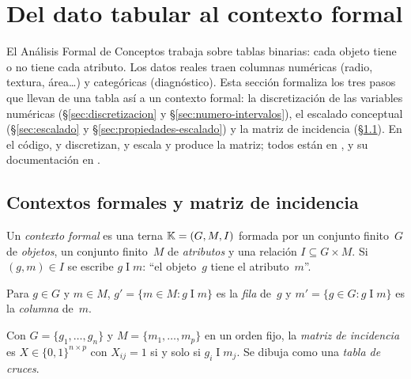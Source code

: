 \section{Del dato tabular al contexto formal}
\label{sec:contexto}

El Análisis Formal de Conceptos trabaja sobre tablas binarias: cada objeto tiene o no tiene cada atributo. Los datos reales traen columnas numéricas (radio, textura, área\dots) y categóricas (diagnóstico). Esta sección formaliza los tres pasos que llevan de una tabla así a un contexto formal: la discretización de las variables numéricas (\S\ref{sec:discretizacion} y \S\ref{sec:numero-intervalos}), el escalado conceptual (\S\ref{sec:escalado} y \S\ref{sec:propiedades-escalado}) y la matriz de incidencia (\S\ref{sec:contextos}). En el código,  y  discretizan, y  escala y produce la matriz; todos están en , y su documentación en .


\subsection{Contextos formales y matriz de incidencia}
\label{sec:contextos}

\begin{definicion}\label{def:contexto}
Un \emph{contexto formal} es una terna $\mathbb{K} = (G, M, I)$ formada por un conjunto finito~$G$ de \emph{objetos}, un conjunto finito~$M$ de \emph{atributos} y una relación $I \subseteq G \times M$. Si $(g, m) \in I$ se escribe $g \mathrel{I} m$: \enquote{el objeto~$g$ tiene el atributo~$m$}.
\end{definicion}

\begin{definicion}\label{def:fila-columna}
Para $g \in G$ y $m \in M$, $g' = \{ m \in M : g \mathrel{I} m \}$ es la \emph{fila} de~$g$ y $m' = \{ g \in G : g \mathrel{I} m \}$ es la \emph{columna} de~$m$.
\end{definicion}

\begin{definicion}\label{def:matriz}
Con $G = \{g_1, \dots, g_n\}$ y $M = \{m_1, \dots, m_p\}$ en un orden fijo, la \emph{matriz de incidencia} es $X \in \{0, 1\}^{n \times p}$ con $X_{ij} = 1$ si y solo si $g_i \mathrel{I} m_j$. Se dibuja como una \emph{tabla de cruces}.
\end{definicion}

